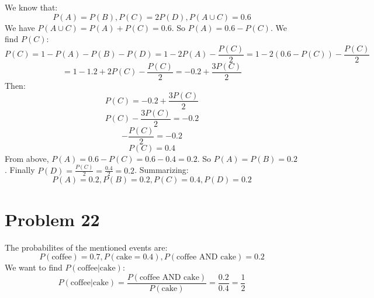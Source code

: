 \documentclass{article}
\begin{document}
We know that:
\begin{equation*}
    P(A) = P(B), P(C) = 2P(D), P(A \cup C) = 0.6
\end{equation*}
We have \(P(A \cup C) = P(A) + P(C) = 0.6\). So \(P(A) = 0.6 - P(C)\). We find \(P(C)\):
\begin{equation*}
    P(C) = 1 - P(A) - P(B) - P(D)  = 1 - 2P(A) - \frac{P(C)}{2} = 1 - 2(0.6 - P(C)) - \frac{P(C)}{2} 
\end{equation*}
\begin{equation*}
    = 1 - 1.2 + 2P(C) - \frac{P(C)}{2} = -0.2 + \frac{3P(C)}{2}
\end{equation*}
Then:
\begin{equation*}
    P(C) = -0.2 + \frac{3P(C)}{2}
\end{equation*}
\begin{equation*}
    P(C) - \frac{3P(C)}{2} = -0.2
\end{equation*}
\begin{equation*}
    -\frac{P(C)}{2} = -0.2
\end{equation*}
\begin{equation*}
    P(C) = 0.4
\end{equation*}
From above, \(P(A) = 0.6 - P(C) = 0.6 - 0.4 = 0.2\). So \(P(A) = P(B) = 0.2\). Finally \(P(D) = \frac{P(C)}{2} = \frac{0.4}{2} = 0.2\). Summarizing:
\begin{equation*}
    P(A) = 0.2, P(B) = 0.2, P(C) = 0.4, P(D) = 0.2
\end{equation*}


\section*{Problem 22}
The probabilites of the mentioned events are:
\begin{equation*}
    P(\mbox{coffee}) = 0.7, P(\mbox{cake} = 0.4), P(\mbox{coffee AND cake}) = 0.2
\end{equation*}
We want to find \(P(\mbox{coffee}|\mbox{cake})\):
\begin{equation*}
    P(\mbox{coffee}|\mbox{cake}) = \frac{P(\mbox{coffee AND cake})}{P(\mbox{cake})} = \frac{0.2}{0.4} = \frac{1}{2}
\end{equation*}
\end{document}
